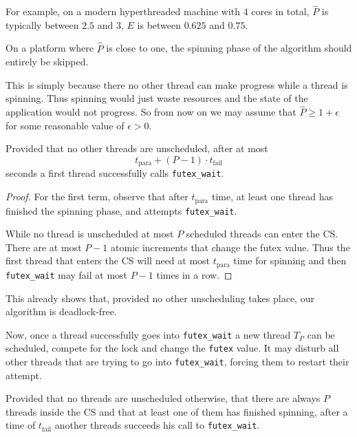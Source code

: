 For example, on a modern hyperthreaded machine with $4$ cores in
total, $\widehat{P}$ is typically between $2.5$ and $3$, $E$ is
between $0.625$ and $0.75$.

\begin{remark}
On a platform where $\widehat{P}$ is close to one, the spinning
phase of the algorithm should entirely be skipped.
\end{remark}

This is simply because there no other thread can make progress
while a thread is spinning. Thus spinning would just waste
resources and the state of the application would not progress.  So
from now on we may assume that $\widehat{P} \geq 1+\epsilon$ for some
reasonable value of $\epsilon > 0$.

\begin{lemma}
Provided that no other threads are unscheduled, after at most
$$t_{\textrm{para}} + (P-1)\cdot t_{\textrm{fail}}$$
seconds a first thread successfully calls \texttt{futex\_wait}.
\end{lemma}

\begin{proof}
For the first term, observe that after $t_{\textrm{para}}$ time,
at least one thread has finished the spinning phase, and attempts
\texttt{futex\_wait}.

While no thread is unscheduled at most $P$ scheduled threads can
enter the CS. There are at most $P-1$ atomic
increments that change the futex value. Thus the first thread that
enters the CS will need at most $t_{\textrm{para}}$
time for spinning and then \texttt{futex\_wait} may fail at most $P-1$
times in a row.
\end{proof}

This already shows that, provided no other unscheduling takes
place, our algorithm is deadlock-free.

Now, once a thread successfully goes into \texttt{futex\_wait} a new
thread $T_P$ can be scheduled, compete for the lock and change the
\texttt{futex} value. It may disturb all other threads that are trying to
go into \texttt{futex\_wait}, forcing them to restart their attempt.

\begin{remark}
Provided that no threads are unscheduled otherwise, that there are
always $P$ threads inside the CS and that at least one of them has
finished spinning, after a time of $t_{\textrm{fail}}$ another
threads succeeds his call to \texttt{futex\_wait}.
\end{remark}

